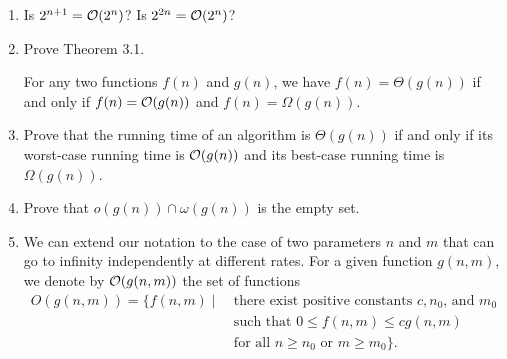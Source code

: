 \documentclass[Chapter03]{subfiles}
\begin{document}
\begin{enumerate}[leftmargin=\labelsep]
		\item Is $2^{n + 1} = \mathcal{O}(2^n)$? Is $2^{2n} = \mathcal{O}(2^n)$?
		\begin{answer}
			
		\end{answer}

		\item Prove Theorem 3.1.
		\begin{theorem}[Theorem 3.1]
			For any two functions $f(n)$ and $g(n)$, we have $f(n) = \Theta(g(n))$ if and only if $f(n) = \mathcal{O}(g(n))$ and $f(n) = \Omega(g(n))$.
		\end{theorem}
		\begin{answer}
			
		\end{answer}

		\item Prove that the running time of an algorithm is $\Theta(g(n))$ if and only if its worst-case running time is $\mathcal{O}(g(n))$ and its best-case running time is $\Omega(g(n))$.
		\begin{answer}
			
		\end{answer}

		\item Prove that $o(g(n)) \cap \omega(g(n))$ is the empty set.
		\begin{answer}
			
		\end{answer}

		\item We can extend our notation to the case of two parameters $n$ and $m$ that can go to infinity independently at different rates. For a given function $g(n,m)$, we denote by $\mathcal{O}(g(n,m))$ the set of functions
		\begin{align*}
			O(g(n,m)) = \{ f(n,m) \mid\ &\text{there exist positive constants $c, n_0$, and $m_0$}\\
				&\text{such that $0 \leq f(n,m) \leq cg(n,m)$}\\
				&\text{for all $n \geq n_0$ or $m \geq m_0$}\}.
		\end{align*}
			
		\begin{answer}
			
		\end{answer}

	\end{enumerate}
\end{document}
